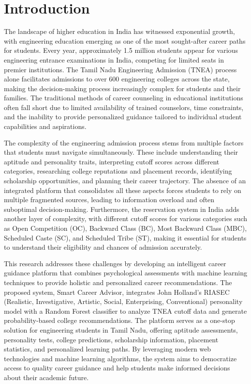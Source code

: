 \documentclass[journal]{IEEEtran}
\begin{document}
\section{Introduction}

The landscape of higher education in India has witnessed exponential growth, with engineering education emerging as one of the most sought-after career paths for students. Every year, approximately 1.5 million students appear for various engineering entrance examinations in India, competing for limited seats in premier institutions. The Tamil Nadu Engineering Admission (TNEA) process alone facilitates admissions to over 600 engineering colleges across the state, making the decision-making process increasingly complex for students and their families. The traditional methods of career counseling in educational institutions often fall short due to limited availability of trained counselors, time constraints, and the inability to provide personalized guidance tailored to individual student capabilities and aspirations.

The complexity of the engineering admission process stems from multiple factors that students must navigate simultaneously. These include understanding their aptitude and personality traits, interpreting cutoff scores across different categories, researching college reputations and placement records, identifying scholarship opportunities, and planning their career trajectory. The absence of an integrated platform that consolidates all these aspects forces students to rely on multiple fragmented sources, leading to information overload and often suboptimal decision-making. Furthermore, the reservation system in India adds another layer of complexity, with different cutoff scores for various categories such as Open Competition (OC), Backward Class (BC), Most Backward Class (MBC), Scheduled Caste (SC), and Scheduled Tribe (ST), making it essential for students to understand their eligibility and chances of admission accurately.

This research addresses these challenges by developing an intelligent career guidance platform that combines psychological assessments with machine learning techniques to provide holistic and personalized career recommendations. The proposed system, Smart Career Advisor, integrates John Holland's RIASEC (Realistic, Investigative, Artistic, Social, Enterprising, Conventional) personality model with a Random Forest classifier to analyze TNEA cutoff data and generate probability-based college recommendations. The platform serves as a one-stop solution for engineering students in Tamil Nadu, offering aptitude assessments, personality tests, college predictions, scholarship information, placement statistics, and personalized learning paths. By leveraging modern web technologies and machine learning algorithms, the system aims to democratize access to quality career guidance and help students make informed decisions about their academic future.
\end{document}
